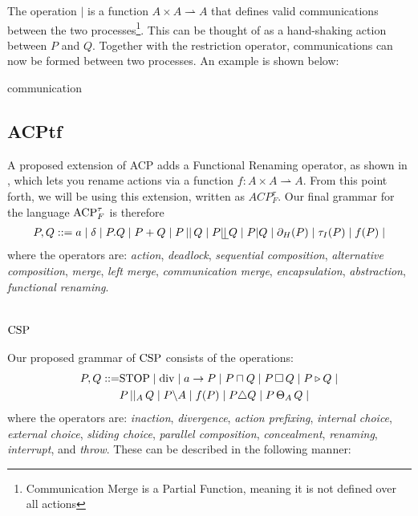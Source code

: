 \documentclass[../hons_project.tex]{subfiles}
\begin{document}
The operation $\mid$ is a function $A \times A \rightharpoonup A$ that defines valid communications between the two processes\footnote{Communication Merge is a Partial Function, meaning it is not defined over all actions}. This can be thought of as a hand-shaking action between $P$ and $Q$. Together with the restriction operator, communications can now be formed between two processes. An example is shown below:

{communication}

\subsection{ACPtf}

A proposed extension of ACP adds a Functional Renaming operator, as shown in \cite{vanglabbeekExpressivenessACP1995}, which lets you rename actions via a function $f : A \times A \rightharpoonup A$. From this point forth, we will be using this extension, written as $ACP^{\tau}_{F}$. Our final grammar for the language $\mathrm{ACP}_{F}^{\tau}$ is therefore
\begin{align*}
   P, Q ::= a \mid \delta \mid P . Q \mid P + Q \mid P \merge Q \mid P \leftmerge Q \mid P | Q \mid \restrict(P) \mid \abtau(P) \mid f(P) \mid
\end{align*}
where the operators are: \textit{action}, \textit{deadlock}, \textit{sequential composition}, \textit{alternative composition},  \textit{merge}, \textit{left merge}, \textit{communication merge}, \textit{encapsulation}, \textit{abstraction}, \textit{functional renaming}.



\section{\texorpdfstring{$\mathrm{CSP}$}{CSP}}\label{ssec:CSP}
Our proposed grammar of $\mathrm{CSP}$ consists of the operations:
\begin{align*}
   P, Q ::= &\mathrm{STOP} \mid \mathrm{div} \mid a\to P \mid P \sqcap Q \mid P \,\square\, Q \mid P \triangleright Q \mid \\
	&P \,\vert\vert_{A}\, Q \mid P \backslash A \mid f(P) \mid P \triangle Q \mid P \,\Theta_{A}\, Q \mid 
\end{align*}
where the operators are: \textit{inaction}, \textit{divergence}, \textit{action prefixing}, \textit{internal choice}, \textit{external choice}, \textit{sliding choice}, \textit{parallel composition}, \textit{concealment}, \textit{renaming}, \textit{interrupt}, and \textit{throw}. These can be described in the following manner:
\end{document}
